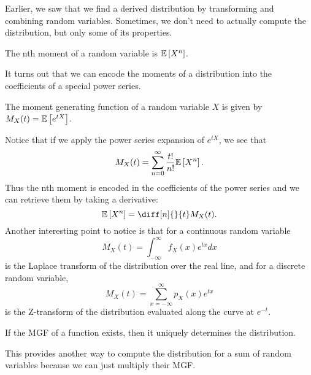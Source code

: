 Earlier, we saw that we find a derived distribution by transforming and combining random variables.
Sometimes, we don't need to actually compute the distribution, but only some of its properties.
\begin{definition}
  The nth moment of a random variable is $\mathbb{E}\left[X^n\right]$.
  \label{defn:moment}
\end{definition}
It turns out that we can encode the moments of a distribution into the coefficients of a special power series.
\begin{definition}
  The moment generating function of a random variable $X$ is given by $M_X(t) = \mathbb{E}\left[e^{tX}\right]$.
  \label{defn:mgf}
\end{definition}
Notice that if we apply the power series expansion of $e^{tX}$, we see that \[
  M_X(t) = \sum_{n=0}^{\infty}\frac{t!}{n!}\mathbb{E}\left[X^n\right].
\]
Thus the nth moment is encoded in the coefficients of the power series and we can retrieve them by taking a derivative:
\[
  \expect{X^n} = \diff[n]{}{t}M_X(t).
\]
Another interesting point to notice is that for a continuous random variable
\[
  M_X(t) = \int_{-\infty}^{\infty}f_X(x)e^{tx}dx
\]
is the Laplace transform of the distribution over the real line,
and for a discrete random variable,
\[
  M_X(t) = \sum_{x=-\infty}^{\infty}p_X(x)e^{tx}
\]
is the Z-transform of the distribution evaluated along the curve at $e^{-t}$.
\begin{theorem}
  If the MGF of a function exists, then it uniquely determines the distribution.
  \label{thm:mgf}
\end{theorem}
This provides another way to compute the distribution for a sum of random variables because we can just multiply their MGF.
